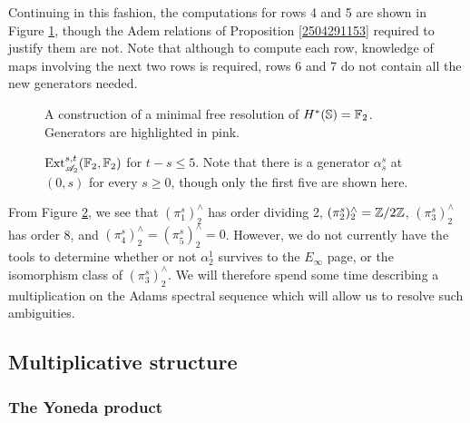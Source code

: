 \documentclass[11pt, titlepage]{article} %
\def\bb{\ensuremath\mathbb}
\def\inte{\ensuremath\mathbb{Z}}
\def\A{\ensuremath{\mathscr{A}_2}}
\DeclareMathOperator{\Ext}{Ext}
\numberwithin{equation}{subsection}
\theoremstyle{plain}
\theoremstyle{definition}
\begin{document}
Continuing in this fashion, the computations for rows 4 and 5 are shown in Figure \ref{2504201106}, though the Adem relations of Proposition \ref{2504291153} required to justify them are not. Note that although to compute each row, knowledge of maps involving the next two rows is required, rows 6 and 7 do not contain all the new generators needed. 

\begin{figure}
\centering

\caption{A construction of a minimal free resolution of \(H^*(\bb{S})=\bb{F}_2\). Generators are highlighted in pink.}\label{2504201106}
\end{figure}

\begin{figure}
\centering

\caption{\(\Ext^{s,t}_{\A}(\bb{F}_2, \bb{F}_2)\) for \(t-s\leq 5\). Note that there is a generator \(\alpha^s_s\) at \((0,s)\) for every \(s\geq 0\), though only the first five are shown here.}
\label{2504241018}
\end{figure}

From Figure \ref{2504241018}, we see that \((\pi_1^s)^\wedge_2\) has order dividing 2, \((\pi_2^s)^\wedge_2=\inte/2\inte\), \((\pi_3^s)^\wedge_2\) has order 8, and \((\pi_4^s)^\wedge_2=(\pi_5^s)^\wedge_2=0\). However, we do not currently have the tools to determine whether or not \(\alpha^1_2\) survives to the \(E_\infty\) page, or the isomorphism class of \((\pi_3^s)^\wedge_2\). We will therefore spend some time describing a multiplication on the Adams spectral sequence which will allow us to resolve such ambiguities.

\subsection{Multiplicative structure}\label{2504291250}

\subsubsection{The Yoneda product}\label{2504171922}
\end{document}
